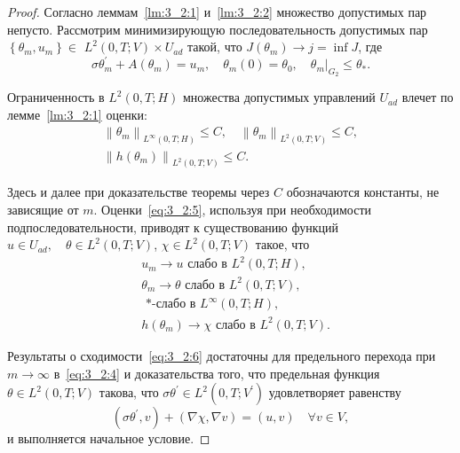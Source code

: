 \begin{proof}
    Согласно леммам~\ref{lm:3_2:1} и~\ref{lm:3_2:2} множество допустимых пар непусто.
    Рассмотрим минимизирующую последовательность допустимых
    пар $\left\{\theta_{m}, u_{m}\right\} \in$ $L^{2}(0, T ; V) \times U_{a d}$
    такой, что $J\left(\theta_{m}\right) \rightarrow j=\inf J$, где
    \begin{equation}
        \label{eq:3_2:4}
        \sigma \theta_{m}^{\prime}+A\left(\theta_{m}\right)=u_{m},
        \quad \theta_{m}(0)=\theta_{0},\left.\quad \theta_{m}\right|_{G_{2}} \leq \theta_{*}.
    \end{equation}

    Ограниченность в $L^{2}(0, T; H)$ множества допустимых
    управлений $U_{a d}$ влечет по лемме~\ref{lm:3_2:1} оценки:
    \begin{equation}
        \label{eq:3_2:5}
        \begin{gathered}
            \left\|\theta_{m}\right\|_{L^{\infty}(0, T ; H)} \leq C,
            \quad\left\|\theta_{m}\right\|_{L^{2}(0, T ; V)} \leq C, \\
            \left\|h\left(\theta_{m}\right)\right\|_{L^{2}(0, T ; V)} \leq C.
        \end{gathered}
    \end{equation}

    Здесь и далее при доказательстве теоремы через $C$
    обозначаются константы, не зависящие от $m$.
    Оценки~\eqref{eq:3_2:5}, используя при необходимости подпоследовательности,
    приводят к существованию функций
    $u \in U_{a d}, \quad \theta \in L^{2}(0, T; V)$, $\chi  \in L^{2}(0, T; V)$
    такое, что
    \begin{equation}
        \label{eq:3_2:6}
        \begin{aligned}
            & u_{m} \rightarrow u \text { слабо в } L^{2}(0, T ; H), \\
            & \theta_{m} \rightarrow \theta \text { слабо в }
            L^{2}(0, T ; V) \text {, } \\
            & \text { *-слабо в } L^{\infty}(0, T ; H), \\
            & h\left(\theta_{m}\right) \rightarrow \chi
            \text { слабо в } L^{2}(0, T; V).
        \end{aligned}
    \end{equation}

    Результаты о сходимости~\eqref{eq:3_2:6} достаточны для предельного перехода
    при $m \rightarrow \infty$ в~\eqref{eq:3_2:4} и доказательства того,
    что предельная функция $\theta \in L^{2}(0, T ; V) $ такова,
    что $\sigma \theta^{\prime} \in L^{2}\left(0, T ; V^{\prime}\right)$
    удовлетворяет равенству
    \[ \left(\sigma \theta^{\prime}, v\right)+(\nabla \chi, \nabla v)=(u, v) \quad \forall v \in V, \]
    и выполняется начальное условие.


\end{proof}
